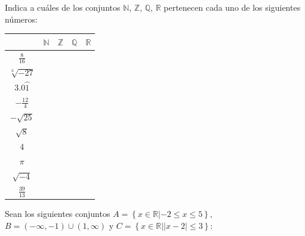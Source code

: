 \documentclass[addpoints,spanish, 12pt,a4paper]{exam}
\renewcommand*\half{.5}
\begin{document}
\begin{questions}

%
%
%

\question[2] Indica a cuáles de los conjuntos
$\mathbb{N}$, $\mathbb{Z}$, $\mathbb{Q}$, $\mathbb{R}$ pertenecen cada uno de los siguientes números:
\begin{center}
\begin{tabular}{|c |c |c |c |c|}\hline
&$\mathbb{N}$& $\mathbb{Z}$& $\mathbb{Q}$&$\mathbb{R}$\\ 
\hline
$\frac{8}{16}$&&&&\\
\hline
$\sqrt[3]{-27}$&&&&\\
\hline
$3.0\wideparen{1}$&&&&\\
\hline
$-\frac{12}{4}$&&&&\\
\hline
$-\sqrt{25}$&&&&\\
\hline
$\sqrt{8}$&&&&\\
\hline
$4$&&&&\\
\hline
$\pi$&&&&\\
\hline
$\sqrt{-4}$&&&&\\
\hline
$\frac{39}{13}$&&&&\\
\hline
\end{tabular}

\end{center}

        \question Sean los siguientes conjuntos $ A=\left\{ x \in \mathbb{R}| -2 \leq x  \leq 5 \right\}$, $  B=\left(-\infty, -1\right) \cup \left(1, \infty\right)$  y  $C=\left\{ x \in \mathbb{R}| \left|{x - 2}\right|\leq3 \right\}$:  


\end{questions}
\end{document}
